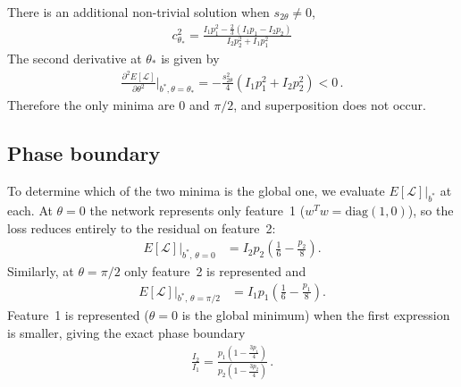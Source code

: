 \documentclass[a4paper]{article}
\begin{document}
There is an additional non-trivial solution when $s_{2\theta}\neq0$,
\begin{align}
c_{\theta_*}^2 = \frac{I_1 p_1^2 -\frac{2}{3}(I_1 p_1 - I_2 p_2) }{ I_2 p_2^2 +I_1 p_1^2}
\end{align}
The second derivative at $\theta_*$ is given by
\begin{align}
\frac{\partial^2 E[\mathcal{L}]}{\partial\theta^2}\Bigg|_{b^*,\theta=\theta_*} = -\frac{s^2_{2\theta}}{4}(I_1 p_1^2+I_2 p_2^2)<0 \,.
\end{align}
Therefore the only minima are $0$ and $\pi/2$, and superposition does not occur.

\subsection*{Phase boundary}
To determine which of the two minima is the global one, we evaluate $E[\mathcal{L}]\big|_{b^*}$ at each. At $\theta=0$ the network represents only feature~1 ($w^Tw = \mathrm{diag}(1,0)$), so the loss reduces entirely to the residual on feature~2:
\begin{align}
E[\mathcal{L}]\big|_{b^*,\,\theta=0} &= I_2 p_2\!\left(\frac{1}{6} - \frac{p_2}{8}\right).
\end{align}
Similarly, at $\theta=\pi/2$ only feature~2 is represented and
\begin{align}
E[\mathcal{L}]\big|_{b^*,\,\theta=\pi/2} &= I_1 p_1\!\left(\frac{1}{6} - \frac{p_1}{8}\right).
\end{align}
Feature~1 is represented ($\theta=0$ is the global minimum) when the first expression is smaller, giving the exact phase boundary
\begin{align}
\frac{I_2}{I_1} = \frac{p_1\!\left(1-\tfrac{3p_1}{4}\right)}{p_2\!\left(1-\tfrac{3p_2}{4}\right)}\,.
\end{align}

\end{document}
